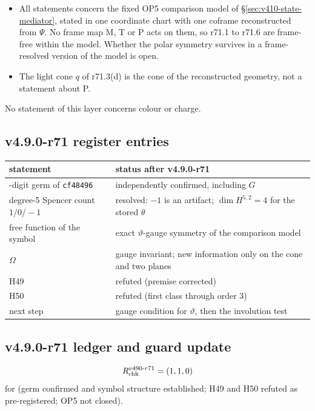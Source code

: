 \begin{itemize}[leftmargin=2em]
\item All statements concern the fixed OP5 comparison model of \S\ref{sec:v410-state-mediator}, stated in one coordinate chart
with one coframe reconstructed from \(\Psi\).  No frame map M, T or P acts on them, so r71.1 to r71.6 are frame-free within the
model.  Whether the polar symmetry survives in a frame-resolved version of the model is open.
\item The light cone \(q\) of r71.3(d) is the cone of the reconstructed geometry, not a statement about P.
\end{itemize}
No statement of this layer concerns colour or charge.

\subsection*{v4.9.0-r71 register entries}
\label{subsec:v490-r71-register}

\begin{center}
\small
\begin{tabular}{@{}>{\raggedright\arraybackslash}p{}>{\raggedright\arraybackslash}p{}@{}}
\toprule
statement & status after v4.9.0-r71\\
\midrule
70-digit germ of \texttt{cf48496} & independently confirmed, including \(G\)\\
degree-5 Spencer count \(1/0/-1\) & resolved: \(-1\) is an artifact; \(\dim H^{5,2}=4\) for the stored \(\theta\)\\
free function of the symbol & exact \(\vartheta\)-gauge symmetry of the comparison model\\
\(\Omega\) & gauge invariant; new information only on the cone and two planes\\
H49 & refuted (premise corrected)\\
H50 & refuted (first class through order 3)\\
next step & gauge condition for \(\vartheta\), then the involution test\\
\bottomrule
\end{tabular}
\end{center}

\subsection*{v4.9.0-r71 ledger and guard update}
\label{subsec:v490-r71-ledger-guard}

\[
R_{\rm chk}^{v490\text{-}r71}=(1,1,0)
\]
for (germ confirmed and symbol structure established; H49 and H50 refuted as pre-registered; OP5 not closed).

